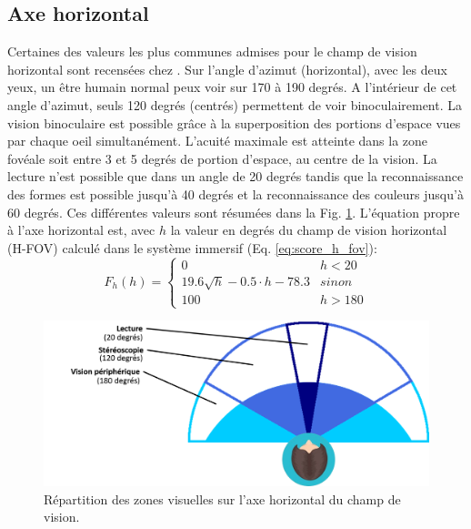 	\subsection{Axe horizontal}
	\par Certaines des valeurs les plus communes admises pour le champ de vision horizontal sont recensées chez \citep{devisme_optimisation_2004}. Sur l'angle d'azimut (horizontal), avec les deux yeux, un être humain normal peux voir sur 170 à 190 degrés. A l'intérieur de cet angle d'azimut, seuls 120 degrés (centrés) permettent de voir binoculairement. La vision binoculaire est possible grâce à la superposition des portions d'espace vues par chaque oeil simultanément. L'acuité maximale est atteinte dans la zone fovéale soit entre 3 et 5 degrés de portion d'espace, au centre de la vision. La lecture n'est possible que dans un angle de 20 degrés tandis que la reconnaissance des formes est possible jusqu'à 40 degrés et la reconnaissance des couleurs jusqu'à 60 degrés. Ces différentes valeurs sont résumées dans la Fig. \ref{fig:champ_vision_horizontal}. L'équation propre à l'axe horizontal est, avec $h$ la valeur en degrés du champ de vision horizontal (H-FOV) calculé dans le système immersif (Eq. \ref{eq:score_h_fov}):
	\begin{equation}
	F_h(h) = \begin{cases}
		0 & h < 20\\
		19.6 \sqrt{h} -0.5 \cdot h -78.3 & sinon\\
		100 & h > 180
	\end{cases}
	\label{eq:score_h_fov}
	\end{equation}
	
	\begin{figure}[h]
		\centering
		\includegraphics[scale=.5]{Figures/ChampVisionHorizontal}
		\caption{Répartition des zones visuelles sur l'axe horizontal du champ de vision.}
		\label{fig:champ_vision_horizontal}
	\end{figure}

